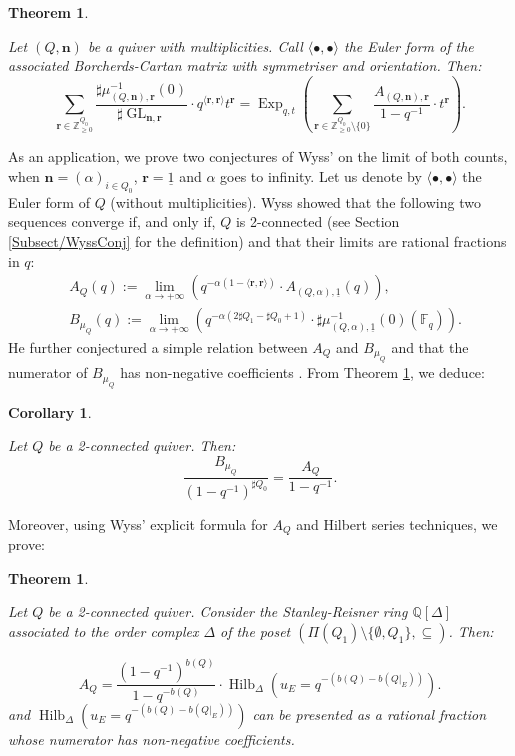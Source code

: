 \documentclass[11pt,english]{article}
\numberwithin{equation}{section}
\numberwithin{figure}{section}
\theoremstyle{definition}
\theoremstyle{plain}
\newtheorem{thm}[df]{Theorem}
\newtheorem{cor}[df]{Corollary}
\theoremstyle{remark}
\DeclareMathOperator{\GL}{GL}
\DeclareMathOperator{\Exp}{Exp}
\DeclareMathOperator{\Hilb}{Hilb}
\newcommand\nn{\mathbf{n}}
\newcommand\rr{\mathbf{r}}
\newcommand\ZZ{\mathbb{Z}}
\newcommand\QQ{\mathbb{Q}}
\newcommand\FF{\mathbb{F}}
\begin{document}
\begin{thm} \label{Thm/Ch2ExpFmlKacPol}

Let $(Q,\nn)$ be a quiver with multiplicities. Call $\langle\bullet,\bullet\rangle$
the Euler form of the associated Borcherds-Cartan matrix with symmetriser
and orientation. Then: \[
\sum_{\rr\in\ZZ_{\geq0}^{Q_0}}
\frac{\sharp\mu_{(Q,\nn),\rr}^{-1}(0)}{\sharp\GL_{\nn,\rr}}
\cdot q^{\langle\rr,\rr\rangle}t^{\rr}
=
\Exp_{q,t}\left(
\sum_{\rr\in\ZZ_{\geq0}^{Q_0}\setminus\{0\}}
\frac{A_{(Q,\nn),\rr}}{1-q^{-1}}\cdot t^{\rr}
\right).
\]

\end{thm}

As an application, we prove two conjectures of Wyss' \cite[Conj. 4.32-4.37.]{Wys17b}
on the limit of both counts, when $\nn=(\alpha)_{i\in Q_{0}}$, $\rr=\underline{1}$
and $\alpha$ goes to infinity. Let us denote by $\langle\bullet,\bullet\rangle$
the Euler form of $Q$ (without multiplicities). Wyss showed that
the following two sequences converge if, and only if, $Q$ is 2-connected
(see Section \ref{Subsect/WyssConj} for the definition) and that
their limits are rational fractions in $q$:\begin{align*}
& A_{Q}(q):=
\underset{\alpha\rightarrow +\infty}{\lim}
\left(q^{-\alpha (1-\langle\rr,\rr\rangle)}\cdot A_{(Q,\alpha),\underline{1}}(q)\right), \\
& B_{\mu_{Q}}(q):=
\underset{\alpha\rightarrow +\infty}{\lim}
\left(q^{-\alpha(2\sharp Q_1-\sharp Q_0+1)}\cdot\sharp\mu_{(Q,\alpha),\underline{1}}^{-1}(0)(\FF_q)\right).
\end{align*} He further conjectured a simple relation between $A_{Q}$ and $B_{\mu_{Q}}$
\cite[Conj. 4.37.]{Wys17b} and that the numerator of $B_{\mu_{Q}}$
has non-negative coefficients \cite[Conj. 4.32.]{Wys17b}. From Theorem
\ref{Thm/Ch2ExpFmlKacPol}, we deduce:

\begin{cor} \label{Cor/Ch2WyssConjAvsB}

Let $Q$ be a 2-connected quiver. Then: \[
\frac{B_{\mu_{Q}}}{(1-q^{-1})^{\sharp Q_0}}=\frac{A_{Q}}{1-q^{-1}}.
\]

\end{cor}

Moreover, using Wyss' explicit formula for $A_{Q}$ \cite[Cor. 4.35.]{Wys17b}
and Hilbert series techniques, we prove:

\begin{thm} \label{Thm/Ch2WyssConjPositivity}

Let $Q$ be a 2-connected quiver. Consider the Stanley-Reisner ring
$\QQ[\Delta]$ associated to the order complex $\Delta$ of the poset
$(\Pi(Q_{1})\setminus\{\emptyset,Q_{1}\},\subseteq)$. Then:

\[
A_Q=\frac{(1-q^{-1})^{b(Q)}}{1-q^{-b(Q)}}\cdot\Hilb_{\Delta}\left(u_{E}=q^{-(b(Q)-b(Q\vert_{E}))}\right).
\] and $\Hilb_{\Delta}\left(u_{E}=q^{-(b(Q)-b(Q\vert_{E}))}\right)$
can be presented as a rational fraction whose numerator has non-negative
coefficients.

\end{thm}
\end{document}
